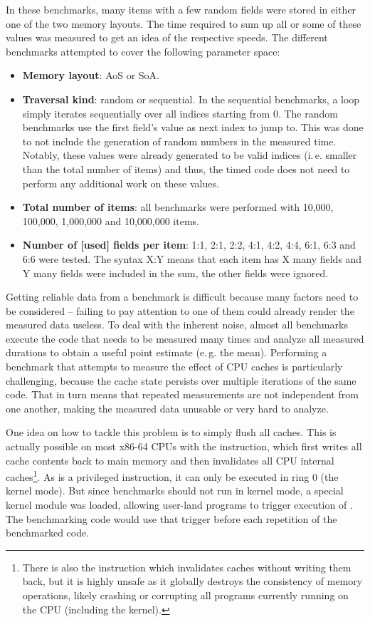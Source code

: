 In these benchmarks, many items with a few random  fields were stored in either one of the two memory layouts.
The time required to sum up all or some of these values was measured to get an idea of the respective speeds.
The different benchmarks attempted to cover the following parameter space:

\begin{itemize}
  \item \textbf{Memory layout}: AoS or SoA.
  \item \textbf{Traversal kind}: random or sequential.
  In the sequential benchmarks, a loop simply iterates sequentially over all indices starting from 0.
  The random benchmarks use the first field's  value as next index to jump to.
  This was done to not include the generation of random numbers in the measured time.
  Notably, these  values were already generated to be valid indices (i.\,e. smaller than the total number of items) and thus, the timed code does not need to perform any additional work on these values.
  \item \textbf{Total number of items}: all benchmarks were performed with 10,000, 100,000, 1,000,000 and 10,000,000 items.
  \item \textbf{Number of [used] fields per item}: 1:1, 2:1, 2:2, 4:1, 4:2, 4:4, 6:1, 6:3 and 6:6 were tested.
  The syntax X:Y means that each item has X many fields and Y many fields were included in the sum, the other fields were ignored.
\end{itemize}

Getting reliable data from a benchmark is difficult because many factors need to be considered -- failing to pay attention to one of them could already render the measured data useless.
To deal with the inherent noise, almost all benchmarks execute the code that needs to be measured many times and analyze all measured durations to obtain a useful point estimate (e.\,g. the mean).
Performing a benchmark that attempts to measure the effect of CPU caches is particularly challenging, because the cache state persists over multiple iterations of the same code.
That in turn means that repeated measurements are not independent from one another, making the measured data unusable or very hard to analyze.

One idea on how to tackle this problem is to simply flush all caches.
This is actually possible on most x86-64 CPUs with the  instruction, which first writes all cache contents back to main memory and then invalidates all CPU internal caches\footnote{There is also the  instruction which invalidates caches without writing them back, but it is highly unsafe as it globally destroys the consistency of memory operations, likely crashing or corrupting all programs currently running on the CPU (including the kernel).}.
As  is a privileged instruction, it can only be executed in ring 0 (the kernel mode).
But since benchmarks should not run in kernel mode, a special kernel module was loaded, allowing user-land programs to trigger execution of .
The benchmarking code would use that trigger before each repetition of the benchmarked code.

